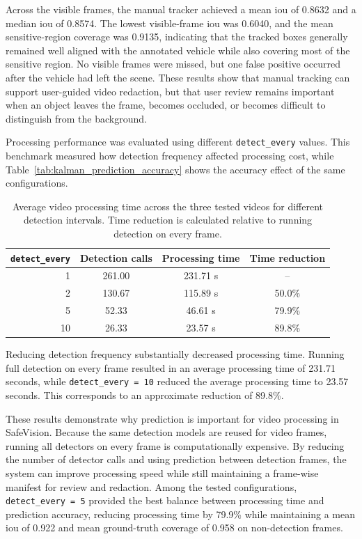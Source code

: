 Across the visible frames, the manual tracker achieved a mean \acrshort{iou} of 0.8632 and a median \acrshort{iou} of 0.8574. The lowest visible-frame \acrshort{iou} was 0.6040, and the mean sensitive-region coverage was 0.9135, indicating that the tracked boxes generally remained well aligned with the annotated vehicle while also covering most of the sensitive region. No visible frames were missed, but one \gls{false positive} occurred after the vehicle had left the scene. These results show that manual tracking can support user-guided video redaction, but that user review remains important when an object leaves the frame, becomes occluded, or becomes difficult to distinguish from the background.


Processing performance was evaluated using different \texttt{detect\_every} values. This benchmark measured how detection frequency affected processing cost, while Table~\ref{tab:kalman_prediction_accuracy} shows the accuracy effect of the same configurations.

\begin{table}[H]
\centering
\begin{tabular}{rccc}
\toprule
\textbf{\texttt{detect\_every}} & \textbf{Detection calls} & \textbf{Processing time} & \textbf{Time reduction} \\
\midrule
1  & 261.00 & 231.71 s & -- \\
2  & 130.67 & 115.89 s & 50.0\% \\
5  & 52.33  & 46.61 s  & 79.9\% \\
10 & 26.33  & 23.57 s  & 89.8\% \\
\bottomrule
\end{tabular}
\caption{Average video processing time across the three tested videos for different detection intervals. Time reduction is calculated relative to running detection on every frame.}
\label{tab:video_processing_performance}
\end{table}

Reducing detection frequency substantially decreased processing time. Running full detection on every frame resulted in an average processing time of 231.71 seconds, while \texttt{detect\_every = 10} reduced the average processing time to 23.57 seconds. This corresponds to an approximate reduction of 89.8\%.

These results demonstrate why prediction is important for video processing in \gls{SafeVision}. Because the same detection models are reused for video frames, running all detectors on every frame is computationally expensive. By reducing the number of detector calls and using prediction between detection frames, the system can improve processing speed while still maintaining a frame-wise manifest for review and redaction. Among the tested configurations, \texttt{detect\_every = 5} provided the best balance between processing time and prediction accuracy, reducing processing time by 79.9\% while maintaining a mean \acrshort{iou} of 0.922 and mean ground-truth coverage of 0.958 on non-detection frames.